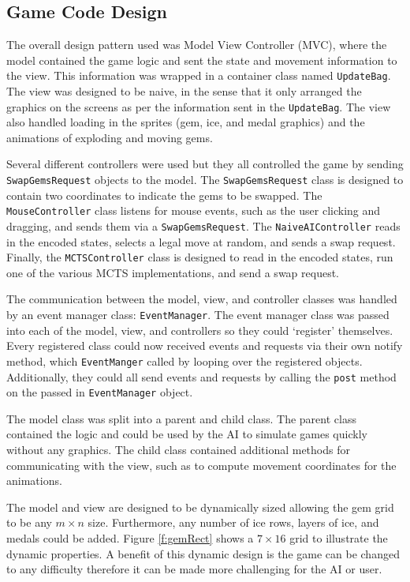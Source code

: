 \documentclass{bhamthesis}
\theoremstyle{definition}
\begin{document}
\subsection{Game Code Design}

The overall design pattern used was Model View Controller (MVC), where the model contained the game logic and sent the state and movement information to the view. This information was wrapped in a container class named \verb|UpdateBag|. The view was designed to be naive, in the sense that it only arranged the graphics on the screens as per the information sent in the \verb|UpdateBag|. The view also handled loading in the sprites (gem, ice, and medal graphics) and the animations of exploding and moving gems.

Several different controllers were used but they all controlled the game by sending \verb|SwapGemsRequest| objects to the model. The \verb|SwapGemsRequest| class is designed to contain two coordinates to indicate the gems to be swapped. The \verb|MouseController| class listens for mouse events, such as the user clicking and dragging, and sends them via a \verb|SwapGemsRequest|. The \verb|NaiveAIController| reads in the encoded states, selects a legal move at random, and sends a swap request.
Finally, the \verb|MCTSController| class is designed to read in the encoded states, run one of the various MCTS implementations, and send a swap request.

The communication between the model, view, and controller classes was handled by an event manager class: \verb|EventManager|. The event manager class was passed into each of the model, view, and controllers so they could `register' themselves. Every registered class could now received events and requests via their own notify method, which \verb|EventManger| called by looping over the registered objects. Additionally, they could all send events and requests by calling the \verb|post| method on the passed in \verb|EventManager| object.

The model class was split into a parent and child class. The parent class contained the logic and could be used by the AI to simulate games quickly without any graphics. The child class contained additional methods for communicating with the view, such as to compute movement coordinates for the animations.

The model and view are designed to be dynamically sized allowing the gem grid to be any $m \times n$ size. Furthermore, any number of ice rows, layers of ice, and medals could be added. Figure \ref{f:gemRect} shows a $7 \times 16$ grid to illustrate the dynamic properties. A benefit of this dynamic design is the game can be changed to any difficulty therefore it can be made more challenging for the AI or user.
\end{document}
